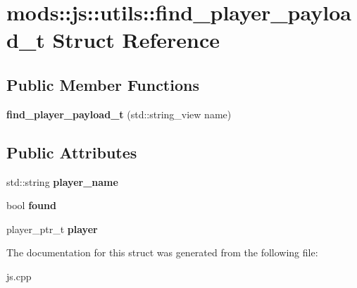 \hypertarget{structmods_1_1js_1_1utils_1_1find__player__payload__t}{}\section{mods\+:\+:js\+:\+:utils\+:\+:find\+\_\+player\+\_\+payload\+\_\+t Struct Reference}
\label{structmods_1_1js_1_1utils_1_1find__player__payload__t}
\subsection*{Public Member Functions}
\begin{DoxyCompactItemize}
\item 
\mbox{\label{structmods_1_1js_1_1utils_1_1find__player__payload__t_a92fb108f170a569b1ccb78c9b6ab93e1}} 
{\bfseries find\+\_\+player\+\_\+payload\+\_\+t} (std\+::string\+\_\+view name)
\end{DoxyCompactItemize}
\subsection*{Public Attributes}
\begin{DoxyCompactItemize}
\item 
\mbox{\label{structmods_1_1js_1_1utils_1_1find__player__payload__t_a5aadbb1da0f9c38275befbb323e74244}} 
std\+::string {\bfseries player\+\_\+name}
\item 
\mbox{\label{structmods_1_1js_1_1utils_1_1find__player__payload__t_a6d100d3c160b7d32db3f1a27a43e2bf9}} 
bool {\bfseries found}
\item 
\mbox{\label{structmods_1_1js_1_1utils_1_1find__player__payload__t_a572d48995858c373fa014e46d66cd298}} 
player\+\_\+ptr\+\_\+t {\bfseries player}
\end{DoxyCompactItemize}


The documentation for this struct was generated from the following file\+:\begin{DoxyCompactItemize}
\item 
js.\+cpp\end{DoxyCompactItemize}
